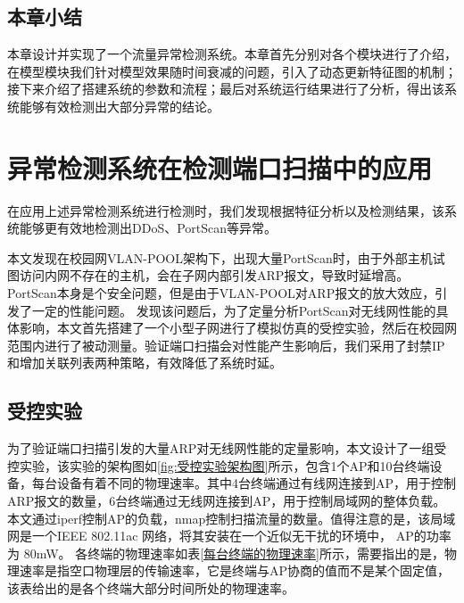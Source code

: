 

\section{本章小结}
本章设计并实现了一个流量异常检测系统。本章首先分别对各个模块进行了介绍，在模型模块我们针对模型效果随时间衰减的问题，引入了动态更新特征图的机制；接下来介绍了搭建系统的参数和流程；最后对系统运行结果进行了分析，得出该系统能够有效检测出大部分异常的结论。

\chapter{异常检测系统在检测端口扫描中的应用}
在应用上述异常检测系统进行检测时，我们发现根据特征分析以及检测结果，该系统能够更有效地检测出DDoS、PortScan等异常。

本文发现在校园网VLAN-POOL架构下，出现大量PortScan时，由于外部主机试图访问内网不存在的主机，会在子网内部引发ARP报文，导致时延增高。PortScan本身是个安全问题，但是由于VLAN-POOL对ARP报文的放大效应，引发了一定的性能问题。
发现该问题后，为了定量分析PortScan对无线网性能的具体影响，本文首先搭建了一个小型子网进行了模拟仿真的受控实验，然后在校园网范围内进行了被动测量。验证端口扫描会对性能产生影响后，我们采用了封禁IP和增加关联列表两种策略，有效降低了系统时延。

\section{受控实验}
为了验证端口扫描引发的大量ARP对无线网性能的定量影响，本文设计了一组受控实验，该实验的架构图如\ref{fig:受控实验架构图}所示，包含1个AP和10台终端设备，每台设备有着不同的物理速率。其中4台终端通过有线网连接到AP，用于控制ARP报文的数量，6台终端通过无线网连接到AP，用于控制局域网的整体负载。本文通过iperf控制AP的负载，nmap控制扫描流量的数量。值得注意的是，该局域网是一个IEEE 802.11ac 网络，将其安装在一个近似无干扰的环境中， AP的功率为 80mW。 各终端的物理速率如表\ref{每台终端的物理速率}所示，需要指出的是，物理速率是指空口物理层的传输速率，它是终端与AP协商的值而不是某个固定值，该表给出的是各个终端大部分时间所处的物理速率。

